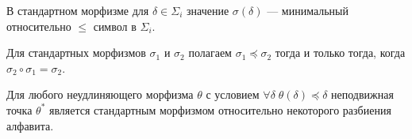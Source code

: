 \documentclass[fontsize=14pt]{scrartcl}
\begin{document}
В стандартном морфизме для $\delta \in \Sigma_i$ значение $\sigma(\delta)$ --- минимальный относительно $\leq$ символ в $\Sigma_i$.

\begin{Definition}
\label{def:morphorder}
Для стандартных морфизмов $\sigma_1$ и $\sigma_2$ полагаем $\sigma_1 \preceq \sigma_2$ тогда и только тогда, когда $\sigma_2 \circ \sigma_1 = \sigma_2$.
\end{Definition}

Для любого неудлиняющего морфизма $\theta$ с условием $\forall \delta\; \theta(\delta) \preceq \delta$ неподвижная точка $\theta^*$ является стандартным морфизмом относительно некоторого разбиения алфавита.

  
  
  
\end{document}

